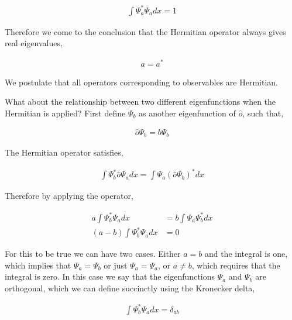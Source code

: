 \documentclass[11pt]{amsart}
\begin{document}
\begin{align*}
  \int\Psi_a^*\Psi_a dx = 1
\end{align*}

Therefore we come to the conclusion that the Hermitian operator always gives real eigenvalues,

\begin{align*}
  a = a^*
\end{align*}

We postulate that all operators corresponding to observables are Hermitian.

What about the relationship between two different eigenfunctions when the Hermitian is applied? First define $\Psi_b$ as another eigenfunction of $\hat{o}$, such that,

\begin{align*}
  \hat{o}\Psi_b = b\Psi_b
\end{align*}

The Hermitian operator satisfies,

\begin{align*}
  \int\Psi_b^*\hat{o}\Psi_a dx = \int\Psi_a(\hat{o}\Psi_b)^* dx
\end{align*}

Therefore by applying the operator,

\begin{align*}
  a\int\Psi_b^*\Psi_a dx &= b\int\Psi_a\Psi_b^* dx \\
  \left(a - b\right) \int\Psi_b^*\Psi_a dx &= 0
\end{align*}

For this to be true we can have two cases. Either $a = b$ and the integral is one, which implies that $\Psi_a = \Psi_b$ or just $\Psi_a = \Psi_a$, or $a \neq b$, which requires that the integral is zero. In this case we say that the eigenfunctions $\Psi_a$ and $\Psi_b$ are orthogonal, which we can define succinctly using the Kronecker delta,

\begin{align*}
  \int\Psi_b^*\Psi_a dx = \delta_{ab}
\end{align*}
\end{document}

